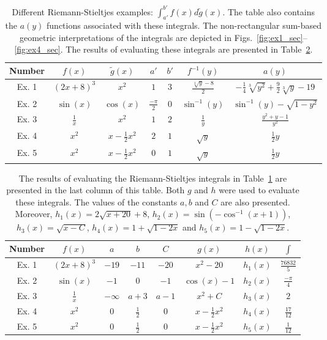 \documentclass{article}
\theoremstyle{theorem}
\theoremstyle{definition}
\begin{document}
\begin{table}[h!]
\centering
\caption{Different Riemann-Stieltjes examples: $\int_{a'}^{b'}f(x)d\widetilde{g}(x)$. The table also contains the $a(y)$ functions 
associated with these integrals. The non-rectangular sum-based geometric interpretations of the integrals are depicted in Figs.~\ref{fig:ex1_sec}--\ref{fig:ex4_sec}.
The results of evaluating these integrals are presented in Table~\ref{tab:table2}.
}
\label{tab:table1}
\begin{tabular}{|c|c|c|c|c||c|c|} 
 Number &$f(x)$ & $\widetilde{g}(x)$&$a'$&$b'$&$f^{-1}(y)$&$a(y)$\\
 \hline
 \hline
 Ex. 1 &$(2x+8)^3$&$x^2$&$1$&$3$&$\frac{\sqrt[3]{y} - 8}{2}$&$-\frac{1}{4}\sqrt[3]{y^2} + \frac{9}{2}\sqrt[3]{y} - 19$\\
 Ex. 2 &$\sin(x)$&$\cos(x)$&$\frac{-\pi}{2}$&$0$&$\sin^{-1}(y)$&$\sin^{-1}(y)-\sqrt{1-y^2}$\\ 
 Ex. 3 &$\frac{1}{x}$&$x^2$&$1$&$2$&$\frac{1}{y}$&$\frac{y^2+y-1}{y^2}$\\
 Ex. 4 &$x^2$&$x-\frac{1}{2}x^2$&$2$&$1$&$\sqrt{y}$&$\frac{1}{2}y$\\
 Ex. 5 &$x^2$&$x-\frac{1}{2}x^2$&$0$&$1$&$\sqrt{y}$&$\frac{1}{2}y$
 \end{tabular}
\end{table}

\begin{table}[h!]
\centering
\caption{The results of evaluating the Riemann-Stieltjes integrals in Table~\ref{tab:table1} are presented in the last column of this table. Both $g$ and $h$ were used to 
evaluate these integrals. The values of the constants $a,b$ and $C$ are also presented. Moreover, $h_1(x) = 2\sqrt{x+20}+8$, $h_2(x)=\sin(-\cos^{-1}(x+1))$, $h_3(x)=\sqrt{x-C}$, $h_4(x)=1+\sqrt{1-2x}$ and
$h_5(x)=1-\sqrt{1-2x}$.}
\label{tab:table2}
\begin{tabular}{|c|c||c|c|c||c|c|c|} 
 Number &$f(x)$&$a$&$b$&$C$&$g(x)$&$h(x)$&$\int$\\
 \hline
 \hline
 Ex. 1 &$(2x+8)^3$&$-19$&$-11$&$-20$&$x^2-20$&$h_1(x)$&$\frac{76832}{5}$\\
 Ex. 2 &$\sin(x)$&$-1$&$0$&$-1$&$\cos(x)-1$&$h_2(x)$&$\frac{-\pi}{4}$\\
 Ex. 3 &$\frac{1}{x}$&$-\infty$&$a+3$&$a-1$&$x^2+C$&$h_3(x)$&$2$\\
 Ex. 4 &$x^2$&$0$&$\frac{1}{2}$&$0$&$x-\frac{1}{2}x^2$&$h_4(x)$&$\frac{17}{12}$\\
 Ex. 5 &$x^2$&$0$&$\frac{1}{2}$&$0$&$x-\frac{1}{2}x^2$&$h_5(x)$&$\frac{1}{12}$\\
 \end{tabular}
\end{table}
\end{document}
